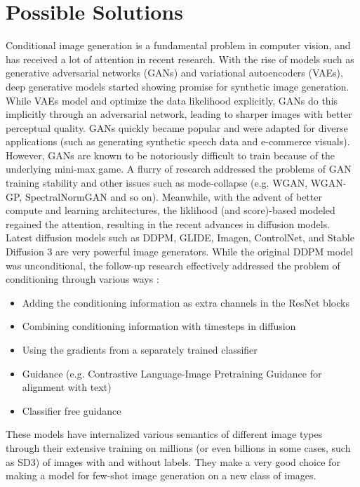 \documentclass[]{article}
\begin{document}
\section{Possible Solutions}
Conditional image generation is a fundamental problem in computer vision, and has received a lot of attention in recent research. With the rise of models such as generative adversarial networks (GANs) and variational autoencoders (VAEs), deep generative models started showing promise for synthetic image generation. While VAEs model and optimize the data likelihood explicitly, GANs do this implicitly through an adversarial network, leading to sharper images with better perceptual quality. GANs quickly became popular and were adapted for diverse applications (such as generating synthetic speech data and e-commerce visuals). However, GANs are known to be notoriously difficult to train because of the underlying mini-max game. A flurry of research addressed the problems of GAN training stability and other issues such as mode-collapse (e.g. WGAN, WGAN-GP, SpectralNormGAN and so on). Meanwhile, with the advent of better compute and learning architectures, the liklihood (and score)-based modeled regained the attention, resulting in the recent advances in diffusion models. Latest diffusion models such as DDPM, GLIDE, Imagen, ControlNet, and Stable Diffusion 3 are very powerful image generators. While the original DDPM model was unconditional, the follow-up research effectively addressed the problem of conditioning through various ways : 
\begin{itemize}
	\item Adding the conditioning information as extra channels in the ResNet blocks
	\item Combining conditioning information with timesteps in diffusion
	\item Using the gradients from a separately trained classifier
	\item Guidance (e.g. Contrastive Language-Image Pretraining Guidance for alignment with text)
	\item Classifier free guidance 
\end{itemize}
These models have internalized various semantics of different image types through their extensive training on millions (or even billions in some cases, such as SD3) of images with and without labels. They make a very good choice for making a model for few-shot image generation on a new class of images. 
\end{document}
